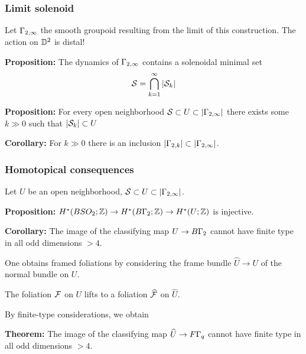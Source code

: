 \documentclass{beamer}
\begin{document}
 
\frame
{
  \frametitle{Limit solenoid}
  
 Let $\Gamma_{2,\infty}$ the smooth groupoid resulting from the limit of this construction. The action on ${\mathbb D}^2$ is   distal!
 \medskip
 
 {\bf Proposition:} The dynamics of $\Gamma_{2,\infty}$ contains a solenoidal minimal set
 $${\mathcal S} = \bigcap_{k=1}^{\infty} | {\mathcal S}_k |$$
 
 \medskip
 
 
{\bf Proposition:} For every open neighborhood ${\mathcal S} \subset U \subset |\Gamma_{2,\infty}|$ there exists some $k \gg 0$ such that 
$|{\mathcal S}_k| \subset U$

\medskip

{\bf Corollary:} 
For   $k \gg 0$ there is an inclusion
$|\Gamma_{2,k}| \subset |\Gamma_{2,\infty}|$.
 

 
 
  \vfill
  
}
  
   
\frame
{
  \frametitle{Homotopical consequences}
  
  Let $U$ be an open neighborhood, ${\mathcal S} \subset U \subset | \Gamma_{2,\infty}|$.
  
  \medskip
  
  {\bf Proposition:} 
  $H^*(BSO_2 ; {\mathbb Z}) \to H^*(B\Gamma_2 ; {\mathbb Z}) \to H^*(U ; {\mathbb Z})$ is injective.
 
 \bigskip
 \pause
 
  {\bf Corollary:} The image of the classifying map 
  $U \to B\Gamma_2$ cannot have finite type in all odd dimensions $> 4$.
 
 \bigskip
 \pause
 
 One obtains framed foliations by considering the frame bundle $\widehat{U} \to U$ of the normal bundle on $U$. 
 
 \medskip
 
 The foliation ${\mathcal F}$ on $U$ lifts to a foliation $\widehat{{\mathcal F}}$ on $\widehat{U}$. 
 
 \medskip
 
 By finite-type considerations, we obtain
 
 \medskip
 
 {\bf Theorem:} The image of the classifying map $\widehat{U} \to F\Gamma_q$ cannot have finite type in all odd dimensions $> 4$.

 
 
  \vfill
  
}
  
\end{document}
